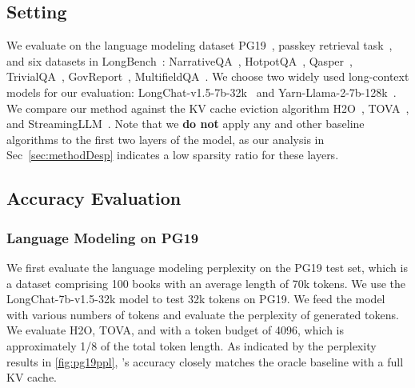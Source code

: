 \subsection{Setting}
We evaluate \method on the language modeling dataset PG19~\cite{raecompressive2019}, passkey retrieval task~\cite{peng2023yarn}, and six datasets in LongBench~\cite{bai2023longbench}: NarrativeQA~\cite{kocisky-etal-2018-narrativeqa}, HotpotQA~\cite{yang2018hotpotqa}, Qasper~\cite{dasigi2021dataset}, TrivialQA~\cite{joshi-etal-2017-triviaqa}, GovReport~\cite{huang-etal-2021-efficient}, MultifieldQA~\cite{bai2023longbench}. We choose two widely used long-context models for our evaluation: LongChat-v1.5-7b-32k~\cite{longchat2023} and Yarn-Llama-2-7b-128k~\cite{peng2023yarn}. We compare our method against the KV cache eviction algorithm H2O~\cite{zhang2023h2o}, TOVA~\cite{oren2024transformers}, and StreamingLLM~\cite{xiao2023streamingllm}. Note that we \textbf{do not} apply any \method and other baseline algorithms to the first two layers of the model, as our analysis in Sec~\ref{sec:methodDesp} indicates a low sparsity ratio for these layers.

\subsection{Accuracy Evaluation}
\subsubsection{Language Modeling on PG19}

We first evaluate the language modeling perplexity on the PG19 test set, which is a dataset comprising 100 books with an average length of 70k tokens. We use the LongChat-7b-v1.5-32k model to test 32k tokens on PG19. We feed the model with various numbers of tokens and evaluate the perplexity of generated tokens. We evaluate H2O, TOVA, and \method with a token budget of 4096, which is approximately 1/8 of the total token length.  As indicated by the perplexity results in \fig\ref{fig:pg19ppl}, \method's accuracy closely matches the oracle baseline with a full KV cache.

